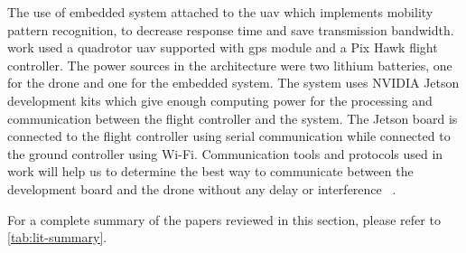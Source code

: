\documentclass[../main.tex]{subfiles}
\begin{document}
	The use of embedded system attached to the \gls{uav} which implements mobility pattern recognition, to decrease response time and save transmission bandwidth. 
	\citeauthor{Zhao18} work used a quadrotor \gls{uav} supported with \gls{gps} module and a Pix 
	Hawk flight controller. The power sources in the architecture were two lithium batteries, 
	one for the drone and one for the embedded system. The system uses NVIDIA Jetson development
	kits which give enough computing power for the processing and communication between the flight 
	controller and the system. The Jetson board is connected to the flight controller using serial 
	communication while connected to the ground controller using Wi-Fi. Communication tools and protocols used in \citeauthor{Zhao18} work will help us to determine the best way to communicate between the development board and the drone without any delay or interference ~\cite{Zhao18}. 
	
	
	For a complete summary of the papers reviewed
	in this section, please refer to \cref{tab:lit-summary}.
	
	
	
\end{document}
